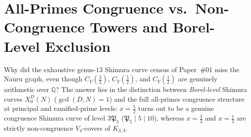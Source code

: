 \documentclass[11pt]{amsart}
\numberwithin{equation}{section}
\theoremstyle{plain}
\theoremstyle{definition}\newtheorem{definition}[theorem]{Definition}
\theoremstyle{remark}\newtheorem{remark}[theorem]{Remark}
\newcommand{\Q}{\mathbb{Q}}
\begin{document}
\section{All-Primes Congruence vs.\ Non-Congruence Towers and Borel-Level Exclusion}\label{sec:noncongruence}
Why did the exhaustive genus-$13$ Shimura curve census of Paper~\#01 miss the Nauru graph, even though $C_Y(\frac32)$, $C_Y(\frac52)$, and $C_Y(\frac12)$ are genuinely arithmetic over $\Q$? The answer lies in the distinction between \emph{Borel-level} Shimura curves $X_0^D(N)$ ($\gcd(D,N)=1$) and the full all-primes congruence structure at principal and ramified-prime levels: $x=\frac52$ turns out to be a genuine congruence Shimura curve of level $3\mathfrak{P}_5$ ($\mathfrak{P}_5\mid 5\mid 10$), whereas $x=\frac32$ and $x=\frac12$ are strictly non-congruence $V_4$-covers of $K_{3,3}$.
\end{document}
